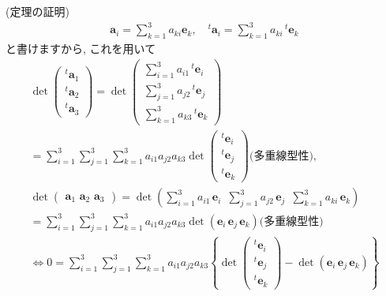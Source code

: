 \documentclass[openany, a4paper, oneside]{jsbook}
\theoremstyle{break}
\theoremstyle{breakdefn}
\begin{document}
(定理の証明)
    \begin{align}
        \bm{a}_{i} = \sum_{k=1}^3 a_{k i} \bm{e}_{k} ,
        \quad
        ^{t}\bm{a}_{i} = \sum_{k=1}^3 a_{k i} \, ^{t}\bm{e}_{k}
    \end{align}
と書けますから, これを用いて
    \begin{gather}
        \det \begin{pmatrix} ^{t}\bm{a}_1 \\ ^{t}\bm{a}_2 \\ ^{t}\bm{a}_3 \end{pmatrix}
        =  \det \begin{pmatrix} \sum_{i=1}^3 a_{i1} \, ^{t}\bm{e}_{i} \\ \sum_{j=1}^3 a_{j2} \, ^{t}\bm{e}_j
        \\ \sum_{k=1}^3 a_{k3} \, ^{t}\bm{e}_{k} \end{pmatrix} \\
        = \sum_{i=1}^3 \sum_{j=1}^3 \sum_{k=1}^3 a_{i1} a_{j2} a_{k3}
            \det \begin{pmatrix} ^{t}\bm{e}_{i} \\ ^{t}\bm{e}_{j} \\ ^{t}\bm{e}_{k} \end{pmatrix}\text{(多重線型性)} ,\\
        \det \begin{pmatrix} \bm{a}_1 \,\, \bm{a}_2 \,\, \bm{a}_3 \end{pmatrix}
        = \det \left (  \sum_{i=1}^3 a_{i1} \, \bm{e}_{i}  \,\,\,  \sum_{j=1}^3 a_{j2} \, \bm{e}_{j}
                \,\,\,  \sum_{k=1}^3 a_{k i} \, \bm{e}_{k}  \right) \\
        = \sum_{i=1}^3 \sum_{j=1}^3 \sum_{k=1}^3 a_{i1} a_{j2} a_{k3}
            \det \left ( \bm{e}_{i} \, \bm{e}_{j} \, \bm{e}_{k} \right) \text{(多重線型性)}  \\
        \Longleftrightarrow
        0 = \sum_{i=1}^3 \sum_{j=1}^3 \sum_{k=1}^3 a_{i1} a_{j2} a_{k3}
                                    \left \{            \det \begin{pmatrix}
                                                        ^{t}\bm{e}_{i} \\ ^{t}\bm{e}_{j} \\ ^{t}\bm{e}_{k}
                                                     \end{pmatrix}
                                                -\det \left ( \bm{e}_{i} \, \bm{e}_{j} \, \bm{e}_{k} \right)
                                    \right \}
    \end{gather}
\end{document}
